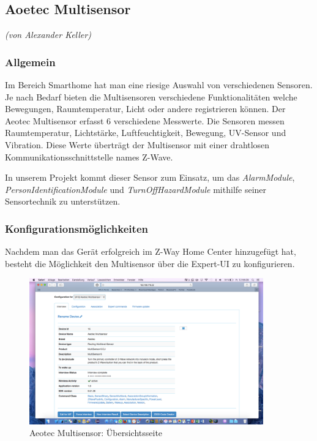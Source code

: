 \subsection{Aoetec Multisensor}
\emph{(von Alexander Keller)}

\subsubsection{Allgemein}

Im Bereich Smarthome hat man eine riesige Auswahl von verschiedenen Sensoren. Je nach Bedarf bieten die Multisensoren verschiedene Funktionalitäten welche Bewegungen, Raumtemperatur, Licht oder andere registrieren können. Der Aeotec Multisensor erfasst 6 verschiedene Messwerte. Die Sensoren messen Raumtemperatur, Lichtstärke, Luftfeuchtigkeit, Bewegung, UV-Sensor und Vibration. Diese Werte überträgt der Multisensor mit einer drahtlosen Kommunikationsschnittstelle names Z-Wave.

In unserem Projekt kommt dieser Sensor zum Einsatz, um das \emph{AlarmModule}, \emph{PersonIdentificationModule} und \emph{TurnOffHazardModule} mithilfe seiner Sensortechnik zu unterstützen.


\subsubsection{Konfigurationsmöglichkeiten}

Nachdem man das Gerät erfolgreich im Z-Way Home Center hinzugefügt hat, besteht die Möglichkeit den Multisensor über die Expert-UI zu konfigurieren.

\begin{figure}[h!]
	\centering
	\includegraphics[width=0.9\textwidth]{img/Sensorevaluation/AeoScreenshot.png}
	\caption{Aeotec Multisensor: Übersichtsseite}
	\label{fig:sensorenAeoScreenshot}
\end{figure}

